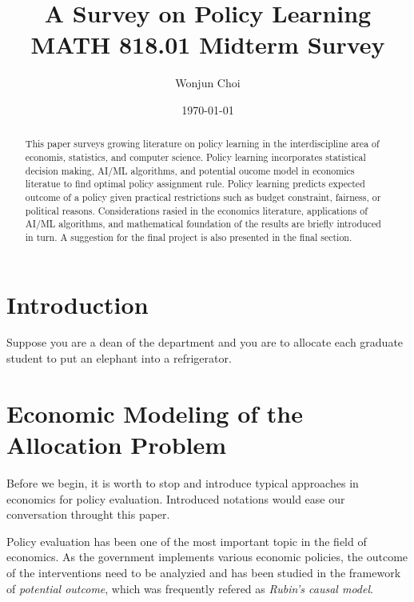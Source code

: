 \documentclass[11pt]{article}
\title{A Survey on Policy Learning\\
	\large MATH 818.01 Midterm Survey
}
\author{Wonjun Choi}
\date{\today}
\newtheorem{theorem}{Theorem}
\newcommand{\rr}{\mathbb{R}}
\begin{document}
	
	\maketitle
	
	\begin{abstract}
This paper surveys growing literature on policy learning in the interdiscipline area of economis, statistics, and computer science. Policy learning incorporates statistical decision making, AI/ML algorithms, and potential oucome model in economics literatue to find optimal policy assignment rule. Policy learning predicts expected outcome of a policy given practical restrictions such as budget constraint, fairness, or political reasons. Considerations rasied in the economics literature, applications of AI/ML algorithms, and mathematical foundation of the results are briefly introduced in turn. A suggestion for the final project is also presented in the final section.
	\end{abstract}
	
	\section{Introduction}\label{section-introduction}
Suppose you are a dean of the department and you are to allocate each graduate student to put an elephant into a refrigerator.
	
	
	\section{Economic Modeling of the Allocation Problem}
	Before we begin, it is worth to stop and introduce typical approaches in economics for policy evaluation. Introduced notations would ease our conversation throught this paper.
	
	Policy evaluation has been one of the most important topic in the field of economics.  As the government implements various economic policies, the outcome of the interventions need to be analyzied and has been studied in the framework of \textit{potential outcome}, which was frequently refered as \textit{Rubin's causal model}.
	
\end{document}
